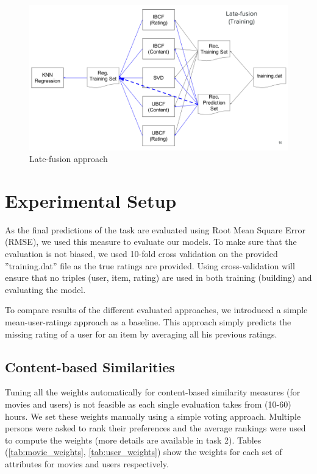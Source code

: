\documentclass{sigish}
\begin{document}
\begin{figure}
	\centering
	\includegraphics[width=\columnwidth]{images/late_fusion_approach.png}
	\caption{Late-fusion approach}
	\label{fig:late_fusion_approach}
\end{figure}

\section{Experimental Setup}

As the final predictions of the task are evaluated using Root Mean Square Error (RMSE), we used this measure to evaluate our models. To make sure that the evaluation is not biased, we used 10-fold cross validation on the provided ''training.dat'' file as the true ratings are provided. Using cross-validation will ensure that no triples (user, item, rating) are used in both training (building) and evaluating the model.

To compare results of the different evaluated approaches, we introduced a simple mean-user-ratings approach as a baseline. This approach simply predicts the missing rating of a user for an item by averaging all his previous ratings.

\subsection{Content-based Similarities}
Tuning all the weights automatically for content-based similarity measures (for movies and users) is not feasible as each single evaluation takes from (10-60) hours. We set these weights manually using a simple voting approach. Multiple persons were asked to rank their preferences and the average rankings were used to compute the weights (more details are available in task 2). Tables (\ref{tab:movie_weights}, \ref{tab:user_weights}) show the weights for each set of attributes for movies and users respectively.
\end{document}
